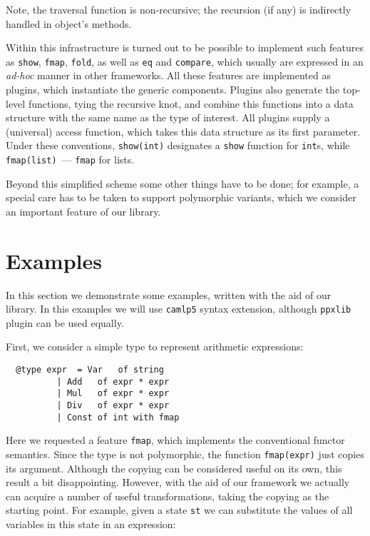 \documentclass[twocolumn,8pt]{extarticle}
\newcommand{\cd}[1]{\texttt{#1}}
\begin{document}
Note, the traversal function is non-recursive; the recursion (if any) is indirectly handled in object's methods.

Within this infrastructure is turned out to be possible to implement such features as \cd{show}, \cd{fmap}, \cd{fold},
as well as \cd{eq} and \cd{compare}, which usually are expressed in an \emph{ad-hoc} manner in other frameworks. All these features are
implemented as plugins, which instantiate the generic components. Plugins also generate the top-level functions, tying the recursive knot,
and combine this functions into a data structure with the same name as the type of interest. All plugins supply a (universal) access function,
which takes this data structure as its first parameter. Under these conventions, \cd{show(int)} designates a \cd{show} function for \cd{int}s,
while \cd{fmap(list)}~--- \cd{fmap} for lists.

Beyond this simplified scheme some other things have to be done; for example, a special care has to be taken to support polymorphic variants, which
we consider an important feature of our library.

\section{Examples}

In this section we demonstrate some examples, written with the aid of our library. In this examples we will use \cd{camlp5} syntax extension,
although \cd{ppxlib} plugin can be used equally.

First, we consider a simple type to represent arithmetic expressions:

\begin{lstlisting}
  @type expr  = Var   of string
	      | Add   of expr * expr
	      | Mul   of expr * expr
	      | Div   of expr * expr
	      | Const of int with fmap
\end{lstlisting}

Here we requested a feature \cd{fmap}, which implements the conventional functor semantics. Since the type is not polymorphic, the function \cd{fmap(expr)}
just copies its argument. Although the copying can be considered useful on its own, this result a bit disappointing. However, with the aid of our framework we
actually can acquire a number of useful transformations, taking the copying as the starting point. For example, given a state \cd{st} we can substitute the
values of all variables in this state in an expression:
\end{document}
